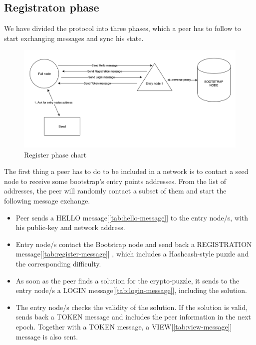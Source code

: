\documentclass[mscthesis]{usiinfthesis}
\begin{document}
\subsection{Registraton phase}
We have divided the protocol into three phases, which a peer has to follow to start exchanging messages and sync his state. 

\begin{figure}[h]
  \includegraphics[width=\linewidth]{images/register-phase.png}
  \caption{Register phase chart}
  \label{fig:register-flow}
\end{figure}

The first thing a peer has to do to be included in a network is to contact a seed node to receive some bootstrap's entry points addresses. From the list of addresses, the peer will randomly contact a subset of them and start the following message exchange.
\begin{itemize}
	\item Peer sends a HELLO message[\ref{tab:hello-message}] to the entry node/s, with his public-key and network address.
	\item Entry node/s contact the Bootstrap node and send back a REGISTRATION message[\ref{tab:register-message}] , which includes a Hashcash-style puzzle and the corresponding difficulty.
	\item As soon as the peer finds a solution for the crypto-puzzle, it sends to the entry node/s a LOGIN message[\ref{tab:login-message}], including the solution.
	\item The entry node/s checks the validity of the solution. If the solution is valid, sends back a TOKEN message and includes the peer information in the next epoch. Together with a TOKEN message, a VIEW[\ref{tab:view-message}] message is also sent.
\end{itemize}
  
\end{document}
